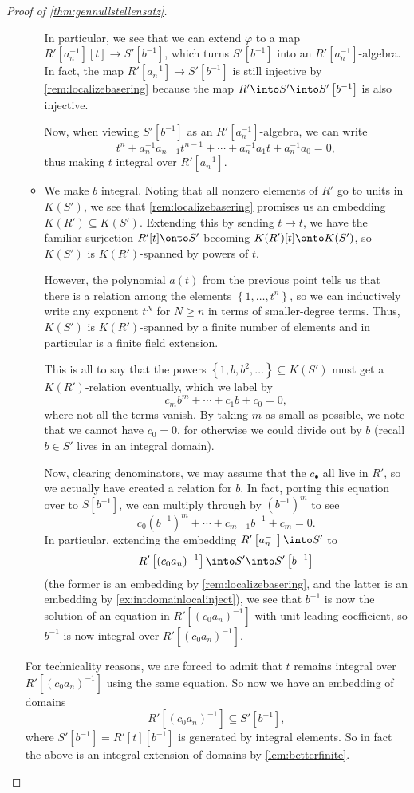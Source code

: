 \documentclass[../notes.tex]{subfiles}
\begin{document}
\begin{proof}[Proof of \autoref{thm:gennullstellensatz}]
\begin{enumerate}[label=(\roman*)]
\begin{itemize}
			In particular, we see that we can extend $\varphi$ to a map $R'\left[a_n^{-1}\right][t]\to S'\left[b^{-1}\right]$, which turns $S'\left[b^{-1}\right]$ into an $R'\left[a_n^{-1}\right]$-algebra. In fact, the map $R'\left[a_n^{-1}\right]\to S'\left[b^{-1}\right]$ is still injective by \autoref{rem:localizebasering} because the map $R'\into S'\into S'\left[b^{-1}\right]$ is also injective.
			
			Now, when viewing $S'\left[b^{-1}\right]$ as an $R'\left[a_n^{-1}\right]$-algebra, we can write
			\[t^n+a_n^{-1}a_{n-1}t^{n-1}+\cdots+a_n^{-1}a_1t+a_n^{-1}a_0=0,\]
			thus making $t$ integral over $R'\left[a_n^{-1}\right]$.

			\item We make $b$ integral. Noting that all nonzero elements of $R'$ go to units in $K(S')$, we see that \autoref{rem:localizebasering} promises us an embedding $K(R')\subseteq K(S')$. Extending this by sending $t\mapsto t$, we have the familiar surjection $R'[t]\onto S'$ becoming $K(R')[t]\onto K(S')$, so $K(S')$ is $K(R')$-spanned by powers of $t$.
			
			However, the polynomial $a(t)$ from the previous point tells us that there is a relation among the elements $\left\{1,\ldots,t^n\right\}$, so we can inductively write any exponent $t^N$ for $N\ge n$ in terms of smaller-degree terms. Thus, $K(S')$ is $K(R')$-spanned by a finite number of elements and in particular is a finite field extension.

			This is all to say that the powers $\left\{1,b,b^2,\ldots\right\}\subseteq K(S')$ must get a $K(R')$-relation eventually, which we label by
			\[c_mb^m+\cdots+c_1b+c_0=0,\]
			where not all the terms vanish. By taking $m$ as small as possible, we note that we cannot have $c_0=0$, for otherwise we could divide out by $b$ (recall $b\in S'$ lives in an integral domain).
			
			Now, clearing denominators, we may assume that the $c_\bullet$ all live in $R'$, so we actually have created a relation for $b$. In fact, porting this equation over to $S\left[b^{-1}\right]$, we can multiply through by $\left(b^{-1}\right)^m$ to see
			\[c_0\left(b^{-1}\right)^m+\cdots+c_{m-1}b^{-1}+c_m=0.\]
			In particular, extending the embedding $R'\left[a_n^{-1}\right]\into S'$ to
			\[R'\left[(c_0a_n)^{-1}\right]\into S'\into S'\left[b^{-1}\right]\]
			(the former is an embedding by \autoref{rem:localizebasering}, and the latter is an embedding by \autoref{ex:intdomainlocalinject}), we see that $b^{-1}$ is now the solution of an equation in $R'\left[(c_0a_n)^{-1}\right]$ with unit leading coefficient, so $b^{-1}$ is now integral over $R'\left[(c_0a_n)^{-1}\right]$.
		\end{itemize}
		For technicality reasons, we are forced to admit that $t$ remains integral over $R'\left[(c_0a_n)^{-1}\right]$ using the same equation. So now we have an embedding of domains
		\[R'\left[(c_0a_n)^{-1}\right]\subseteq S'\left[b^{-1}\right],\]
		where $S'\left[b^{-1}\right]=R'[t]\left[b^{-1}\right]$ is generated by integral elements. So in fact the above is an integral extension of domains by \autoref{lem:betterfinite}.


\end{enumerate}
\end{proof}
\end{document}

